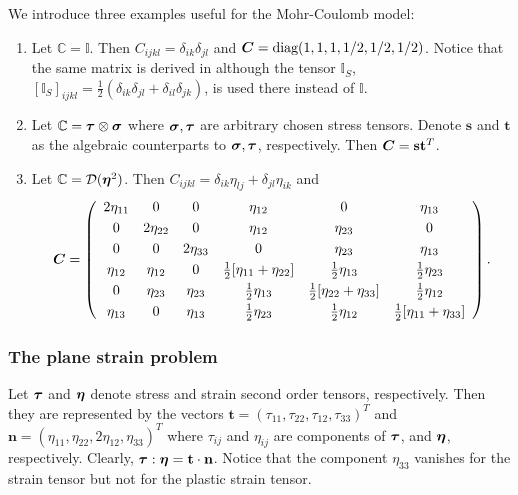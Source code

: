 \documentclass[a4paper,12pt]{article}
\theoremstyle{remark}
\newcommand{\mbf}[1]{\mbox{\boldmath$#1$}}
\numberwithin{equation}{section}
\begin{document}
We introduce three examples useful for the Mohr-Coulomb model:
\begin{enumerate}
\item Let $\mathbb C=\mathbb I$. Then $C_{ijkl}=\delta_{ik}\delta_{jl}$ and $\mbf C=\mbox{diag}(1,1,1,1/2,1/2,1/2)$. Notice that the same matrix is derived in \cite[Appendix D]{NPO08} although the tensor $\mathbb I_{S}$, $[\mathbb I_S]_{ijkl}=\frac{1}{2}(\delta_{ik}\delta_{jl}+\delta_{il}\delta_{jk})$, is used there instead of $\mathbb I$.
\item Let $\mathbb C=\mbf\tau\otimes\mbf\sigma$ where $\mbf\sigma,\mbf\tau$ are arbitrary chosen stress tensors. Denote $\mathbf s$ and $\mathbf t$ as the algebraic counterparts to $\mbf\sigma,\mbf\tau$, respectively. Then $\mbf C=\mathbf s\mathbf t^T$.
\item Let $\mathbb C=\mathcal D(\mbf\eta^2)$. Then $C_{ijkl}=\delta_{ik}\eta_{lj}+\delta_{jl}\eta_{ik}$ and
$$\mbf C=\left(
\begin{array}{c c c c c c}
2\eta_{11} & 0 & 0 & \eta_{12} & 0 & \eta_{13}\\[1mm]
0 & 2\eta_{22} & 0 & \eta_{12} & \eta_{23} & 0\\[1mm]
0 & 0 & 2\eta_{33} & 0 & \eta_{23} & \eta_{13}\\[1mm]
\eta_{12} & \eta_{12} & 0 & \frac{1}{2}[\eta_{11}+\eta_{22}] & \frac{1}{2}\eta_{13} & \frac{1}{2}\eta_{23}\\[1mm]
0 & \eta_{23} & \eta_{23} & \frac{1}{2}\eta_{13} & \frac{1}{2}[\eta_{22}+\eta_{33}] & \frac{1}{2}\eta_{12}\\[1mm]
\eta_{13} & 0 & \eta_{13} & \frac{1}{2}\eta_{23} & \frac{1}{2}\eta_{12} & \frac{1}{2}[\eta_{11}+\eta_{33}]
\end{array}
\right).$$
\end{enumerate}

\subsubsection*{The plane strain problem}

Let $\mbf \tau$ and $\mbf\eta$ denote stress and strain second order tensors, respectively. Then they are represented by the vectors $\mathbf t=( \tau_{11}, \tau_{22}, \tau_{12}, \tau_{33})^T$ and $\mathbf n=(\eta_{11},\eta_{22},2\eta_{12},\eta_{33})^T$ where $\tau_{ij}$ and $\eta_{ij}$ are components of $\mbf \tau$, and $\mbf\eta$, respectively. Clearly, $\mbf \tau:\mbf\eta=\mathbf t\cdot\mathbf n$. Notice that the component $\eta_{33}$ vanishes for the strain tensor but not for the plastic strain tensor.
\end{document}
